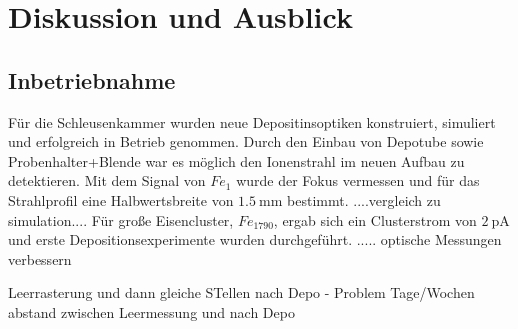 \chapter{Diskussion und Ausblick}
\section{Inbetriebnahme}
Für die Schleusenkammer wurden neue Depositinsoptiken konstruiert, simuliert und erfolgreich in Betrieb genommen.
Durch den Einbau von Depotube sowie Probenhalter+Blende war es möglich den Ionenstrahl im neuen Aufbau zu detektieren.
Mit dem Signal von $Fe_1$ wurde der Fokus vermessen und für das Strahlprofil eine Halbwertsbreite von $\SI{1,5}{\milli\meter}$ bestimmt.
....vergleich zu simulation....
Für große Eisencluster, $Fe_{1790}$, ergab sich ein Clusterstrom von $\SI{2}{\pA}$ und erste Depositionsexperimente wurden durchgeführt.
.....
optische Messungen verbessern

Leerrasterung und dann gleiche STellen nach Depo - Problem Tage/Wochen abstand zwischen Leermessung und nach Depo



